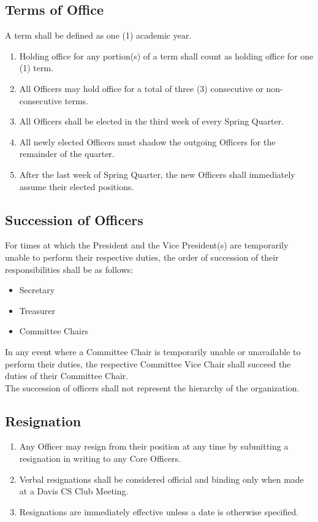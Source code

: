 \documentclass{article}
\newenvironment{li}{
\begin{enumerate}
  \setlength{\itemsep}{1pt}
  \setlength{\parskip}{0pt}
  \setlength{\parsep}{0pt}
}{\end{enumerate}}
\begin{document}
\subsection{Terms of Office}
A term shall be defined as one (1) academic year.
\begin{li}
\item Holding office for any portion(s) of a term shall count as holding office for one (1) term.
\item All Officers may hold office for a total of three (3) consecutive or non-consecutive terms.
\item All Officers shall be elected in the third week of every Spring Quarter.
\item All newly elected Officers must shadow the outgoing Officers for the remainder of the quarter.
\item After the last week of Spring Quarter, the new Officers shall immediately assume their elected positions.
\end{li}

\subsection{Succession of Officers}
For times at which the President and the Vice President(s) are temporarily unable to perform their respective duties, the order of succession of their responsibilities shall be as follows:
\begin{itemize}
  \setlength{\itemsep}{1pt}
  \setlength{\parskip}{0pt}
  \setlength{\parsep}{0pt}
\item Secretary
\item Treasurer
\item Committee Chairs
\end{itemize}
In any event where a Committee Chair is temporarily unable or unavailable to perform their duties, the respective Committee Vice Chair shall succeed the duties of their Committee Chair.\\

\noindent The succession of officers shall not represent the hierarchy of the organization.

\subsection{Resignation}
\begin{li}
\item Any Officer may resign from their position at any time by submitting a resignation in writing to any Core Officers.
\item Verbal resignations shall be considered official and binding only when made at a Davis CS Club Meeting.
\item Resignations are immediately effective unless a date is otherwise specified.
\end{li}
\end{document}
